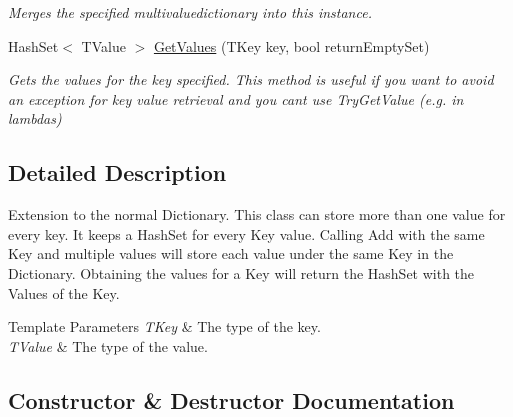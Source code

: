 \begin{DoxyCompactItemize}
\begin{DoxyCompactList}\small\item\em Merges the specified multivaluedictionary into this instance. \end{DoxyCompactList}\item 
Hash\+Set$<$ T\+Value $>$ \mbox{\hyperlink{class_super_tiled2_unity_1_1_editor_1_1_s_d_1_1_tools_1_1_algorithmia_1_1_general_data_structures_1_1_multi_value_dictionary_a6e30cf7a205e22c3c87e88acdc3f778e}{Get\+Values}} (T\+Key key, bool return\+Empty\+Set)
\begin{DoxyCompactList}\small\item\em Gets the values for the key specified. This method is useful if you want to avoid an exception for key value retrieval and you can\textquotesingle{}t use Try\+Get\+Value (e.\+g. in lambdas) \end{DoxyCompactList}\end{DoxyCompactItemize}


\subsection{Detailed Description}
Extension to the normal Dictionary. This class can store more than one value for every key. It keeps a Hash\+Set for every Key value. Calling Add with the same Key and multiple values will store each value under the same Key in the Dictionary. Obtaining the values for a Key will return the Hash\+Set with the Values of the Key. 


\begin{DoxyTemplParams}{Template Parameters}
{\em T\+Key} & The type of the key.\\
\hline
{\em T\+Value} & The type of the value.\\
\hline
\end{DoxyTemplParams}


\subsection{Constructor \& Destructor Documentation}
\mbox{\label{class_super_tiled2_unity_1_1_editor_1_1_s_d_1_1_tools_1_1_algorithmia_1_1_general_data_structures_1_1_multi_value_dictionary_a88bdd33727b767235b716c268c4a52d2}} 
